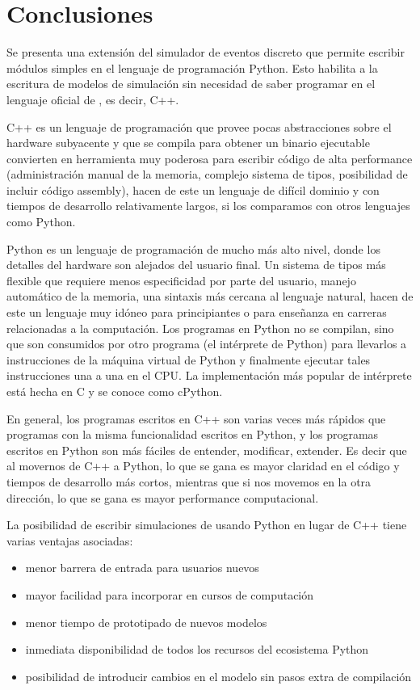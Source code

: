\documentclass[]{article}
\begin{document}
\section{Conclusiones}\label{sec:conc}
Se presenta una extensión del simulador de eventos discreto \omnetpp{} que permite
escribir módulos simples en el lenguaje de programación Python. Esto habilita a
la escritura de modelos de simulación sin necesidad de saber programar en el
lenguaje oficial de \omnetpp{}, es decir, C++.

C++ es un lenguaje de programación que provee pocas abstracciones sobre el
hardware subyacente y que se compila para obtener un binario ejecutable
convierten en herramienta muy poderosa para escribir código de alta performance
(administración manual de la memoria, complejo sistema de tipos, posibilidad de
incluir código assembly), hacen de este un lenguaje de difícil dominio y con
tiempos de desarrollo relativamente largos, si los comparamos con otros
lenguajes como Python.

Python es un lenguaje de programación de mucho más alto nivel, donde los
detalles del hardware son alejados del usuario final. Un sistema de tipos más
flexible que requiere menos especificidad por parte del usuario, manejo
automático de la memoria, una sintaxis más cercana al lenguaje natural, hacen
de este un lenguaje muy idóneo para principiantes o para enseñanza en carreras
relacionadas a la computación. Los programas en Python no se compilan, sino que
son consumidos por otro programa (el intérprete de Python) para llevarlos a
instrucciones de la máquina virtual de Python y finalmente ejecutar tales
instrucciones una a una en el CPU. La implementación más popular de intérprete
está hecha en C y se conoce como cPython.

En general, los programas escritos en C++ son varias veces más rápidos que
programas con la misma funcionalidad escritos en Python, y los programas
escritos en Python son más fáciles de entender, modificar, extender. Es decir
que al movernos de C++ a Python, lo que se gana es mayor claridad en el código
y tiempos de desarrollo más cortos, mientras que si nos movemos en la otra
dirección, lo que se gana es mayor performance computacional.

La posibilidad de escribir simulaciones de \omnetpp{} usando Python en lugar de
C++ tiene varias ventajas asociadas:

\begin{itemize}
    \item menor barrera de entrada para usuarios nuevos

    \item mayor facilidad para incorporar \omnetpp{} en cursos de computación

    \item menor tiempo de prototipado de nuevos modelos

    \item inmediata disponibilidad de todos los recursos del ecosistema Python

    \item posibilidad de introducir cambios en el modelo sin pasos extra de
compilación
\end{itemize}
\end{document}
